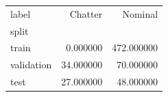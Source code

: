 \begin{tabular}{lrr}
\toprule
label & Chatter & Nominal \\
split &  &  \\
\midrule
train & 0.000000 & 472.000000 \\
validation & 34.000000 & 70.000000 \\
test & 27.000000 & 48.000000 \\
\bottomrule
\end{tabular}
